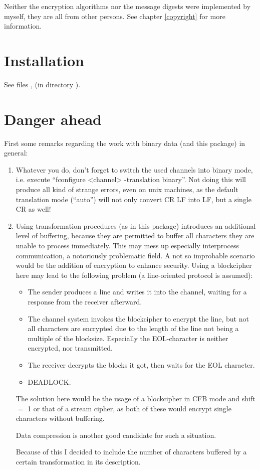 Neither the encryption algorithms nor the message digests were
implemented by myself, they are all from other persons. See chapter
\ref {copyright} for more information.


\chapter {Installation}
See files ,  (in directory ).


\chapter {Danger ahead}

First some remarks regarding the work with binary data (and this
package) in general:

\begin {enumerate}
\item	Whatever you do, don't forget to switch the used channels into
	binary mode, i.e. execute ``fconfigure <channel> -translation
	binary''. Not doing this will produce all kind of strange
	errors, even on unix machines, as the default translation mode
	(``auto'') will not only convert CR LF into LF, but a single
	CR as well!

\item	Using transformation procedures (as in this package)
	introduces an additional level of buffering, because they are
	permitted to buffer all characters they are unable to process
	immediately. This may mess up especially
	interprocess communication, a notoriously problematic field. A
	not so improbable scenario would be the addition of encryption
	to enhance security. Using a blockcipher here may lead to the
	following problem (a line-oriented protocol is assumed):

	\begin {itemize}
	\item	The sender produces a line and writes it into the channel,
		waiting for a response from the receiver afterward.
	\item	The channel system invokes the blockcipher to encrypt
		the line, but not all characters are encrypted due to
		the length of the line not being a multiple of the
		blocksize. Especially the EOL-character is neither
		encrypted, nor transmitted.
	\item	The receiver decrypts the blocks it got, then waits
		for the EOL character.
	\item	DEADLOCK.
	\end   {itemize}

	The solution here would be the usage of a blockcipher in CFB
	mode and shift $=$ 1 or that of a stream cipher, as both of these
	would encrypt single characters without buffering.

	Data compression is another good candidate for such a situation.

	Because of this I decided to include the number of characters
	buffered by a certain transformation in its description.

\end   {enumerate}



